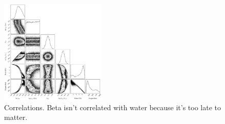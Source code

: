 \documentclass[]{emulateapj}
\begin{document}
\begin{figure}[hbt]
  \begin{center}
      \includegraphics[width=0.45\textwidth]{figures/corner.pdf}
       \caption{Correlations. Beta isn't correlated with water because it's too late to matter.}
     \label{fig:corner}
  \end{center}
\end{figure}

\clearpage


\end{document}

